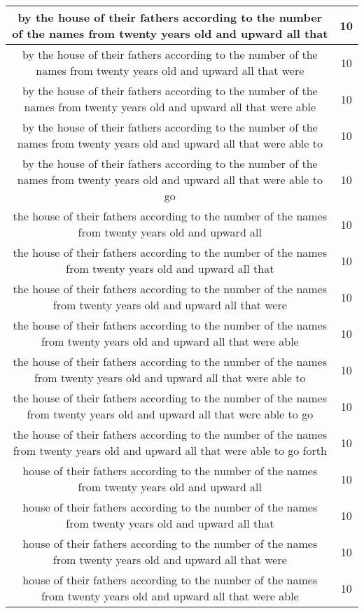 \begin{center}
\begin{longtable}{|c|c|}
by the house of their fathers according to the number of the names from twenty years old and upward all that & 10\\ \hline 
by the house of their fathers according to the number of the names from twenty years old and upward all that were & 10\\ \hline 
by the house of their fathers according to the number of the names from twenty years old and upward all that were able & 10\\ \hline 
by the house of their fathers according to the number of the names from twenty years old and upward all that were able to & 10\\ \hline 
by the house of their fathers according to the number of the names from twenty years old and upward all that were able to go & 10\\ \hline 
the house of their fathers according to the number of the names from twenty years old and upward all & 10\\ \hline 
the house of their fathers according to the number of the names from twenty years old and upward all that & 10\\ \hline 
the house of their fathers according to the number of the names from twenty years old and upward all that were & 10\\ \hline 
the house of their fathers according to the number of the names from twenty years old and upward all that were able & 10\\ \hline 
the house of their fathers according to the number of the names from twenty years old and upward all that were able to & 10\\ \hline 
the house of their fathers according to the number of the names from twenty years old and upward all that were able to go & 10\\ \hline 
the house of their fathers according to the number of the names from twenty years old and upward all that were able to go forth & 10\\ \hline 
house of their fathers according to the number of the names from twenty years old and upward all & 10\\ \hline 
house of their fathers according to the number of the names from twenty years old and upward all that & 10\\ \hline 
house of their fathers according to the number of the names from twenty years old and upward all that were & 10\\ \hline 
house of their fathers according to the number of the names from twenty years old and upward all that were able & 10\\ \hline 

\end{longtable}
\end{center}
